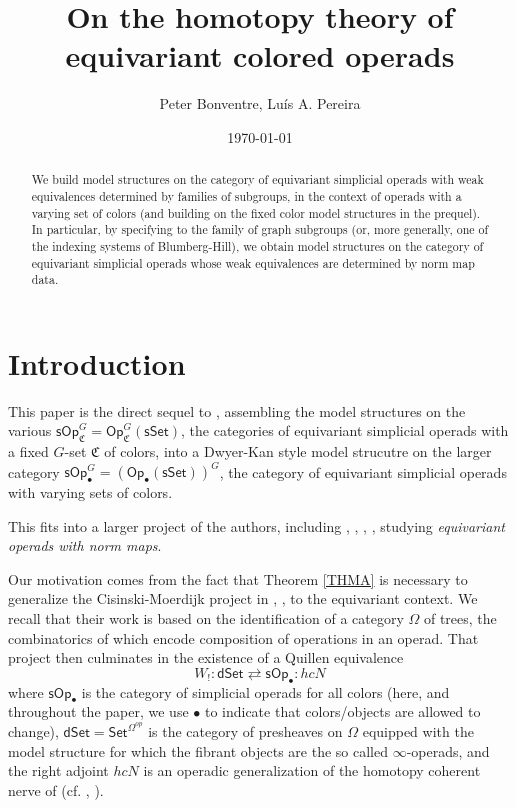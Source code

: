 \documentclass[a4paper,10pt
,draft
]{article}%
\title{On the homotopy theory of equivariant colored operads}
\author{Peter Bonventre, Lu\'is A. Pereira}%
\date{\today}
\numberwithin{equation}{section}
\numberwithin{figure}{section}
\theoremstyle{definition} %
\newcommand{\sSet}{\ensuremath{\mathsf{sSet}}}%
\newcommand{\Op}{\mathsf{Op}}%
\newcommand{\sOp}{\ensuremath{\mathsf{sOp}}}%
\newcommand{\1}{\ensuremath{\mathbbm 1}}%
\begin{document}
\maketitle

\begin{abstract}
	We build model structures 
	on the category of equivariant simplicial operads
	with weak equivalences determined by families of subgroups,
	in the context of operads with a varying set of colors
	(and building on the fixed color model structures in the prequel).
	In particular, by specifying to the family of graph subgroups 
	(or, more generally, one of the indexing systems of Blumberg-Hill),
	we obtain model structures on the category of equivariant simplicial operads
	whose weak equivalences are determined by norm map data.
\end{abstract}



\tableofcontents







\section{Introduction}

This paper is the direct sequel to \cite{BP_FCOP},
assembling the model structures on the various
$\sOp_{\mathfrak C}^G = \Op_{\mathfrak C}^G(\sSet)$,
the categories of equivariant simplicial operads with a fixed $G$-set $\mathfrak C$ of colors,
into a Dwyer-Kan style model strucutre on the larger category
$\sOp_\bullet^G = \left(\Op_\bullet(\sSet)\right)^G$,
the category of equivariant simplicial operads with varying sets of colors.

This fits into a larger project of the authors,
including
\cite{Per18}, \cite{BP_geo}, \cite{BP_edss}, \cite{BP_TAS},
studying 
\emph{equivariant operads with norm maps}.


Our motivation comes from the fact that 
Theorem \ref{THMA} is necessary to 
generalize the Cisinski-Moerdijk project in
\cite{CM11}, \cite{CM13a}, \cite{CM13b} to the equivariant context.
We recall that their work is based on the identification of a category
$\Omega$ of trees, 
the combinatorics of which encode
composition of operations in an operad.
That project then culminates in the existence of a Quillen equivalence
\begin{equation}\label{CMMAINTHM EQ}
	W_!\colon \mathsf{dSet} \rightleftarrows \mathsf{sOp}_{\bullet} \colon hcN
\end{equation}
where 
$\mathsf{sOp}_{\bullet}$
is the category of simplicial operads for all colors
(here, and throughout the paper, we use $\bullet$ to indicate 
that colors/objects are allowed to change),
$\mathsf{dSet} = \mathsf{Set}^{\Omega^{op}}$
is the category of presheaves on $\Omega$
equipped with the model structure for which the fibrant objects are the so called $\infty$-operads,
and the right adjoint $hcN$ is an operadic generalization of the homotopy coherent nerve of \cite{Cor82} (cf. \cite{Joy}, \cite[\S 1.1.5]{Lur09}).
\end{document}
